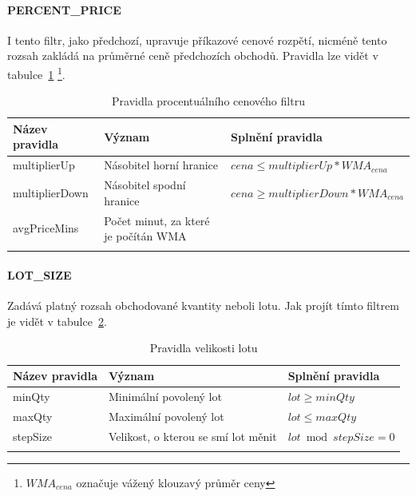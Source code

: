 \paragraph*{PERCENT\_PRICE}
I tento filtr, jako předchozí, upravuje příkazové cenové rozpětí, nicméně tento rozsah zakládá na průměrné ceně předchozích obchodů. Pravidla lze vidět v tabulce~\ref{tab:binance:percent_price}
\footnote{$WMA_{cena}$ označuje vážený klouzavý průměr ceny}.
\begin{center}
    \begin{longtable}[h]{|l|l|l|}
        \hline
        Název pravidla & Význam                               & Splnění pravidla                           \\
        \hline
        multiplierUp   & Násobitel horní hranice              & $ cena \leq multiplierUp * WMA_{cena} $    \\
        \hline
        multiplierDown & Násobitel spodní hranice             & $ cena \geq  multiplierDown * WMA_{cena} $ \\
        \hline
        avgPriceMins   & Počet minut, za které je počítán WMA &                                            \\
        \hline
        \caption{Pravidla procentuálního cenového filtru}
        \label{tab:binance:percent_price}
    \end{longtable}
\end{center}

\paragraph*{LOT\_SIZE}
Zadává platný rozsah obchodované kvantity neboli lotu. Jak projít tímto filtrem je vidět v tabulce~\ref{tab:binance:lot_filter}.
\begin{center}
    \begin{longtable}[h]{|l|l|l|}
        \hline
        Název pravidla & Význam                              & Splnění pravidla         \\
        \hline
        minQty         & Minimální povolený lot              & $ lot \geq minQty $      \\
        \hline
        maxQty         & Maximální povolený lot              & $ lot \leq  maxQty $     \\
        \hline
        stepSize       & Velikost, o kterou se smí lot měnit & $lot \bmod stepSize = 0$ \\
        \hline
        \caption{Pravidla velikosti lotu}
        \label{tab:binance:lot_filter}
    \end{longtable}
\end{center}

